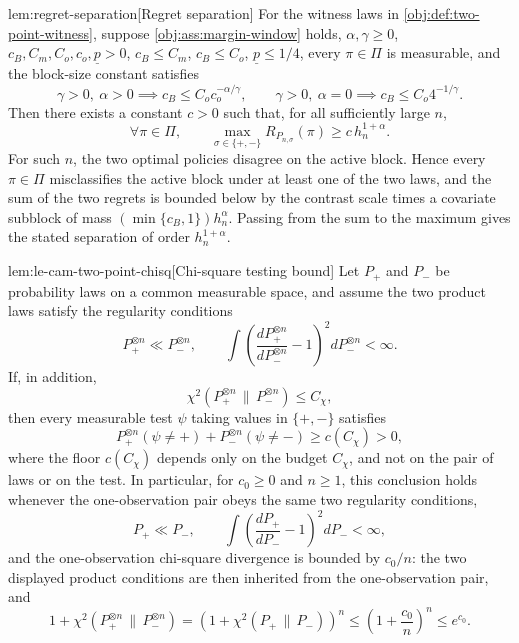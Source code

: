 \begin{lemmav}{lem:regret-separation}[Regret separation]
For the witness laws in \cref{obj:def:two-point-witness}, suppose \cref{obj:ass:margin-window} holds, \(\alpha,\gamma\ge0\), \(c_B,C_m,C_o,c_o,\underline p>0\), \(c_B\le C_m\), \(c_B\le C_o\), \(\underline p\le 1/4\), every \(\pi\in\Pi\) is measurable, and the block-size constant satisfies
\[
\gamma>0,\ \alpha>0 \implies c_B\le C_o c_o^{-\alpha/\gamma},
\qquad
\gamma>0,\ \alpha=0 \implies c_B\le C_o 4^{-1/\gamma}.
\]
Then there exists a constant \(c>0\) such that, for all sufficiently large \(n\),
\[
\forall\pi\in\Pi,\qquad
\max_{\sigma\in\{+,-\}}
R_{P_{n,\sigma}}(\pi)
\ge
c\,h_n^{1+\alpha}.
\]
For such \(n\), the two optimal policies disagree on the active block. Hence every \(\pi\in\Pi\) misclassifies the active block under at least one of the two laws, and the sum of the two regrets is bounded below by the contrast scale times a covariate subblock of mass \((\min\{c_B,1\})h_n^\alpha\). Passing from the sum to the maximum gives the stated separation of order \(h_n^{1+\alpha}\).
\end{lemmav}

\begin{lemmav}{lem:le-cam-two-point-chisq}[Chi-square testing bound]
Let \(P_+\) and \(P_-\) be probability laws on a common measurable space, and assume the two product laws satisfy the regularity conditions
\[
P_+^{\otimes n}\ll P_-^{\otimes n},
\qquad
\int \left(\frac{dP_+^{\otimes n}}{dP_-^{\otimes n}}-1\right)^2
  dP_-^{\otimes n}<\infty.
\]
If, in addition,
\[
\chi^2(P_+^{\otimes n}\,\|\,P_-^{\otimes n})\le C_\chi,
\]
then every measurable test \(\psi\) taking values in \(\{+,-\}\) satisfies
\[
P_+^{\otimes n}(\psi\ne +)
+
P_-^{\otimes n}(\psi\ne -)
\ge
c(C_\chi)>0,
\]
where the floor \(c(C_\chi)\) depends only on the budget \(C_\chi\), and not on the pair of laws or on the test.
In particular, for \(c_0\ge 0\) and \(n\ge 1\), this conclusion holds whenever the one-observation pair obeys the same two regularity conditions,
\[
P_+\ll P_-,
\qquad
\int \left(\frac{dP_+}{dP_-}-1\right)^2 dP_-<\infty,
\]
and the one-observation chi-square divergence is bounded by \(c_0/n\): the two displayed product conditions are then inherited from the one-observation pair, and
\[
1+\chi^2(P_+^{\otimes n}\,\|\,P_-^{\otimes n})
=
\left(1+\chi^2(P_+\,\|\,P_-)\right)^n
\le
\left(1+\frac{c_0}{n}\right)^n
\le e^{c_0}.
\]
\end{lemmav}

